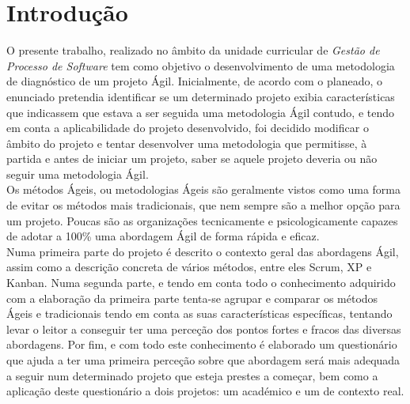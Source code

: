 \chapter{Introdução}

O presente trabalho, realizado no âmbito da unidade curricular de \textit{Gestão de Processo de Software} tem como objetivo o desenvolvimento de uma metodologia de diagnóstico de um projeto Ágil. Inicialmente, de acordo com o planeado, o enunciado pretendia identificar se um determinado projeto exibia características que indicassem que estava a ser seguida uma metodologia Ágil contudo, e tendo em conta a aplicabilidade do projeto desenvolvido, foi decidido modificar o âmbito do projeto e tentar desenvolver uma metodologia que permitisse, à partida e antes de iniciar um projeto, saber se aquele projeto deveria ou não seguir uma metodologia Ágil.\\
Os métodos Ágeis, ou metodologias Ágeis são geralmente vistos como uma forma de evitar os métodos mais tradicionais, que nem sempre são a melhor opção para um projeto. Poucas são as organizações tecnicamente e psicologicamente capazes de adotar a 100\% uma abordagem Ágil de forma rápida e eficaz.\\
Numa primeira parte do projeto é descrito o contexto geral das abordagens Ágil, assim como a descrição concreta de vários métodos, entre eles Scrum, XP e Kanban. Numa segunda parte, e tendo em conta todo o conhecimento adquirido com a elaboração da primeira parte tenta-se agrupar e comparar os métodos Ágeis e tradicionais tendo em conta as suas características específicas, tentando levar o leitor a conseguir ter uma perceção dos pontos fortes e fracos das diversas abordagens. Por fim, e com todo este conhecimento é elaborado um questionário que ajuda a ter uma primeira perceção sobre que abordagem será mais adequada a seguir num determinado projeto que esteja prestes a começar, bem como a aplicação deste questionário a dois projetos: um académico e um de contexto real.